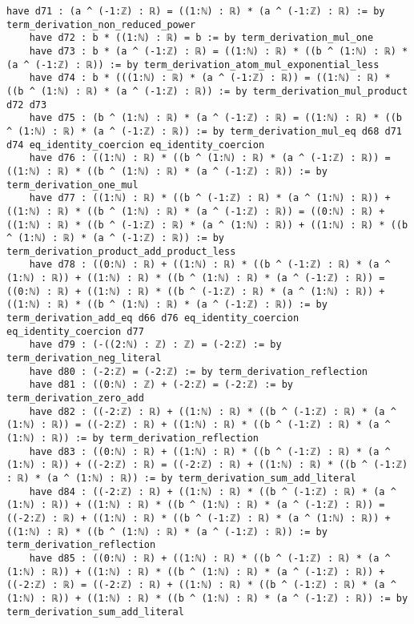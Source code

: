 \documentclass{article}
\begin{document}
\begin{tcolorbox}[colback=white!10, width=\linewidth]
\begin{lstlisting}[language=Lean4]
    have d71 : (a ^ (-1:ℤ) : ℝ) = ((1:ℕ) : ℝ) * (a ^ (-1:ℤ) : ℝ) := by term_derivation_non_reduced_power
    have d72 : b * ((1:ℕ) : ℝ) = b := by term_derivation_mul_one
    have d73 : b * (a ^ (-1:ℤ) : ℝ) = ((1:ℕ) : ℝ) * ((b ^ (1:ℕ) : ℝ) * (a ^ (-1:ℤ) : ℝ)) := by term_derivation_atom_mul_exponential_less
    have d74 : b * (((1:ℕ) : ℝ) * (a ^ (-1:ℤ) : ℝ)) = ((1:ℕ) : ℝ) * ((b ^ (1:ℕ) : ℝ) * (a ^ (-1:ℤ) : ℝ)) := by term_derivation_mul_product d72 d73
    have d75 : (b ^ (1:ℕ) : ℝ) * (a ^ (-1:ℤ) : ℝ) = ((1:ℕ) : ℝ) * ((b ^ (1:ℕ) : ℝ) * (a ^ (-1:ℤ) : ℝ)) := by term_derivation_mul_eq d68 d71 d74 eq_identity_coercion eq_identity_coercion
    have d76 : ((1:ℕ) : ℝ) * ((b ^ (1:ℕ) : ℝ) * (a ^ (-1:ℤ) : ℝ)) = ((1:ℕ) : ℝ) * ((b ^ (1:ℕ) : ℝ) * (a ^ (-1:ℤ) : ℝ)) := by term_derivation_one_mul
    have d77 : ((1:ℕ) : ℝ) * ((b ^ (-1:ℤ) : ℝ) * (a ^ (1:ℕ) : ℝ)) + ((1:ℕ) : ℝ) * ((b ^ (1:ℕ) : ℝ) * (a ^ (-1:ℤ) : ℝ)) = ((0:ℕ) : ℝ) + ((1:ℕ) : ℝ) * ((b ^ (-1:ℤ) : ℝ) * (a ^ (1:ℕ) : ℝ)) + ((1:ℕ) : ℝ) * ((b ^ (1:ℕ) : ℝ) * (a ^ (-1:ℤ) : ℝ)) := by term_derivation_product_add_product_less
    have d78 : ((0:ℕ) : ℝ) + ((1:ℕ) : ℝ) * ((b ^ (-1:ℤ) : ℝ) * (a ^ (1:ℕ) : ℝ)) + ((1:ℕ) : ℝ) * ((b ^ (1:ℕ) : ℝ) * (a ^ (-1:ℤ) : ℝ)) = ((0:ℕ) : ℝ) + ((1:ℕ) : ℝ) * ((b ^ (-1:ℤ) : ℝ) * (a ^ (1:ℕ) : ℝ)) + ((1:ℕ) : ℝ) * ((b ^ (1:ℕ) : ℝ) * (a ^ (-1:ℤ) : ℝ)) := by term_derivation_add_eq d66 d76 eq_identity_coercion eq_identity_coercion d77
    have d79 : (-((2:ℕ) : ℤ) : ℤ) = (-2:ℤ) := by term_derivation_neg_literal
    have d80 : (-2:ℤ) = (-2:ℤ) := by term_derivation_reflection
    have d81 : ((0:ℕ) : ℤ) + (-2:ℤ) = (-2:ℤ) := by term_derivation_zero_add
    have d82 : ((-2:ℤ) : ℝ) + ((1:ℕ) : ℝ) * ((b ^ (-1:ℤ) : ℝ) * (a ^ (1:ℕ) : ℝ)) = ((-2:ℤ) : ℝ) + ((1:ℕ) : ℝ) * ((b ^ (-1:ℤ) : ℝ) * (a ^ (1:ℕ) : ℝ)) := by term_derivation_reflection
    have d83 : ((0:ℕ) : ℝ) + ((1:ℕ) : ℝ) * ((b ^ (-1:ℤ) : ℝ) * (a ^ (1:ℕ) : ℝ)) + ((-2:ℤ) : ℝ) = ((-2:ℤ) : ℝ) + ((1:ℕ) : ℝ) * ((b ^ (-1:ℤ) : ℝ) * (a ^ (1:ℕ) : ℝ)) := by term_derivation_sum_add_literal
    have d84 : ((-2:ℤ) : ℝ) + ((1:ℕ) : ℝ) * ((b ^ (-1:ℤ) : ℝ) * (a ^ (1:ℕ) : ℝ)) + ((1:ℕ) : ℝ) * ((b ^ (1:ℕ) : ℝ) * (a ^ (-1:ℤ) : ℝ)) = ((-2:ℤ) : ℝ) + ((1:ℕ) : ℝ) * ((b ^ (-1:ℤ) : ℝ) * (a ^ (1:ℕ) : ℝ)) + ((1:ℕ) : ℝ) * ((b ^ (1:ℕ) : ℝ) * (a ^ (-1:ℤ) : ℝ)) := by term_derivation_reflection
    have d85 : ((0:ℕ) : ℝ) + ((1:ℕ) : ℝ) * ((b ^ (-1:ℤ) : ℝ) * (a ^ (1:ℕ) : ℝ)) + ((1:ℕ) : ℝ) * ((b ^ (1:ℕ) : ℝ) * (a ^ (-1:ℤ) : ℝ)) + ((-2:ℤ) : ℝ) = ((-2:ℤ) : ℝ) + ((1:ℕ) : ℝ) * ((b ^ (-1:ℤ) : ℝ) * (a ^ (1:ℕ) : ℝ)) + ((1:ℕ) : ℝ) * ((b ^ (1:ℕ) : ℝ) * (a ^ (-1:ℤ) : ℝ)) := by term_derivation_sum_add_literal

\end{lstlisting}
\end{tcolorbox}
\end{document}
